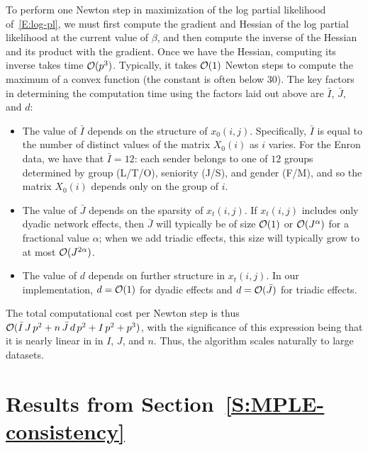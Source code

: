 \documentclass[final]{statsoc}
\begin{document}
To perform one Newton step in maximization of the log partial likelihood of~\eqref{E:log-pl}, we must first compute the gradient and Hessian of the
log partial likelihood at the current value of $\beta$, and then compute the
inverse of the Hessian and its product with the gradient.  Once we have the
Hessian, computing its inverse takes time $\mathcal{O}(p^3)$.  Typically, it takes
$\mathcal{O}(1)$ Newton steps to compute the maximum of a convex function (the
constant is often below $30$).  The key factors in determining the
computation time using the factors laid out above are $\bar I$, $\bar J$, and
$d$:

\begin{itemize}

\item The value of $\bar I$ depends on the structure of $x_0(i,j)$.  Specifically,
$\bar I$ is equal to the number of
distinct values of the matrix $X_0(i)$ as $i$
varies.  For the Enron data, we have that $\bar I = 12$: each sender
belongs to one of $12$ groups determined by group (L/T/O), seniority (J/S),
and gender (F/M), and so the matrix $X_0(i)$ depends only on the group of $i$.

\item The value of $\bar J$ depends on the sparsity of $x_t(i,j)$.  If
$x_t(i,j)$ includes only dyadic network effects, then $\bar J$ will typically
be of size $\mathcal{O}(1)$ or $\mathcal{O}(J^\alpha)$ for a fractional value $\alpha$; when we add triadic effects, this size will typically
grow to at most $\mathcal{O}(J^{2 \alpha})$.

\item The value of $d$ depends on further structure in $x_t(i,j)$.  In our
implementation, $d = \mathcal{O}(1)$ for dyadic effects and $d = \mathcal{O}(\bar J)$ for
triadic effects.

\end{itemize}

The total computational cost per Newton step is thus
$\mathcal{O}(\bar I \, J \, p^2  + n \, \bar J \, d \, p^2 + I \, p^2 + p^3)$, with 
the significance of this expression being that it is nearly linear
in in $I$, $J$, and $n$.  Thus, the algorithm scales naturally to large
datasets.


\newcommand{\MPLEconsistencysection}{\ref{S:MPLE-consistency}}
\section{Results from Section~\protect\MPLEconsistencysection{}}
\label{S:MPLE-consistency-proofs}
\end{document}
